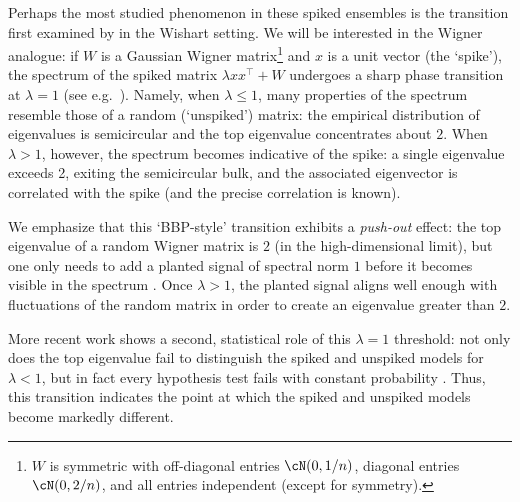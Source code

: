 \documentclass{article}
\begin{document}
Perhaps the most studied phenomenon in these spiked ensembles is the transition first examined by \cite{bbp} in the Wishart setting. We will be interested in the Wigner analogue: if $W$ is a Gaussian Wigner matrix\footnote{$W$ is symmetric with off-diagonal entries $\cN(0,1/n)$, diagonal entries $\cN(0,2/n)$, and all entries independent (except for symmetry).} and $x$ is a unit vector (the `spike'), the spectrum of the spiked matrix $\lambda xx^\top + W$ undergoes a sharp phase transition at $\lambda = 1$ (see e.g.\ \cite{peche,fp,cdf,eig-vec}). Namely, when $\lambda \le 1$, many properties of the spectrum resemble those of a random (`unspiked') matrix: the empirical distribution of eigenvalues is semicircular and the top eigenvalue concentrates about $2$. When $\lambda > 1$, however, the spectrum becomes indicative of the spike: a single eigenvalue exceeds 2, exiting the semicircular bulk, and the associated eigenvector is correlated with the spike (and the precise correlation is known).

We emphasize that this `BBP-style' transition \cite{bbp} exhibits a \emph{push-out} effect: the top eigenvalue of a random Wigner matrix is $2$ (in the high-dimensional limit), but one only needs to add a planted signal of spectral norm $1$ before it becomes visible in the spectrum \cite{fp}. Once $\lambda > 1$, the planted signal aligns well enough with fluctuations of the random matrix in order to create an eigenvalue greater than $2$.

More recent work shows a second, statistical role of this $\lambda=1$ threshold: not only does the top eigenvalue fail to distinguish the spiked and unspiked models for $\lambda < 1$, but in fact every hypothesis test fails with constant probability \cite{omh,mrz,pwbm}. Thus, this transition indicates the point at which the spiked and unspiked models become markedly different.
\end{document}
